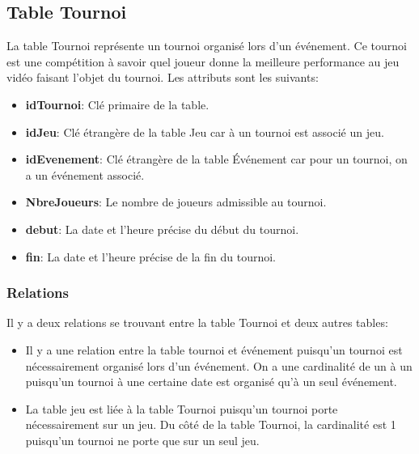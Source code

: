 \documentclass[11pt,french]{article}
\begin{document}
        \subsection{Table Tournoi} %
        \label{sub:table-tournoi}
            La table Tournoi représente un tournoi organisé lors d'un événement. Ce tournoi est une compétition à savoir quel joueur
            donne la meilleure performance au jeu vidéo faisant l'objet du tournoi. Les attributs sont les suivants:\\
            \begin{itemize}
                \item {\bf idTournoi}: Clé primaire de la table.
                \item {\bf idJeu}: Clé étrangère de la table Jeu car à un tournoi est associé un jeu.
                \item {\bf idEvenement}: Clé étrangère de la table Événement car pour un tournoi, on a un événement associé.
                \item {\bf NbreJoueurs}: Le nombre de joueurs admissible au tournoi.
                \item {\bf debut}: La date et l'heure précise du début du tournoi.
                \item {\bf fin}: La date et l'heure précise de la fin du tournoi.
            \end{itemize}

            \subsubsection{Relations} %
            \label{ssub:relations-tournoi}
                Il y a deux relations se trouvant entre la table Tournoi et deux autres tables:\\

                \begin{itemize}
                    \item Il y a une relation entre la table tournoi et événement puisqu'un tournoi est nécessairement organisé lors
                        d'un événement. On a une cardinalité de un à un puisqu'un tournoi à une certaine date est organisé qu'à un seul
                        événement.
                    \item La table jeu est liée à la table Tournoi puisqu'un tournoi porte nécessairement sur un jeu. Du côté de la table
                        Tournoi, la cardinalité est 1 puisqu'un tournoi ne porte que sur un seul jeu.
                \end{itemize}
\end{document}
